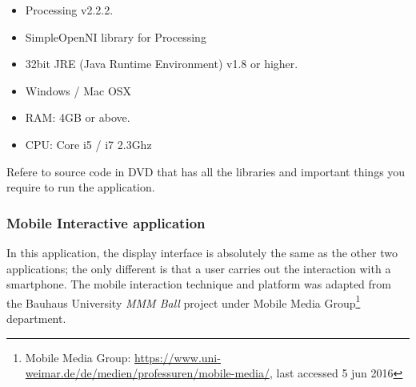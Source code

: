 \begin{itemize}
\item Processing v2.2.2.
\item SimpleOpenNI library for Processing \cite{simpleopenni}
\item 32bit JRE (Java Runtime Environment) v1.8 or higher.
\item Windows / Mac OSX
\item RAM: 4GB or above.
\item CPU: Core i5 / i7 2.3Ghz
\end{itemize}

Refere to source code in DVD that has all the libraries and important things you require to run the application.

\fi

\subsubsection{Mobile Interactive application}
In this application, the display interface is absolutely the same as the other two applications; the only different is that a user carries out the interaction with a smartphone. The mobile interaction technique and platform was adapted from the Bauhaus University \emph{MMM Ball}\cite{MMMball} project under Mobile Media Group\footnote{Mobile Media Group: \url{https://www.uni-weimar.de/de/medien/professuren/mobile-media/}, last accessed 5 jun 2016} department.

